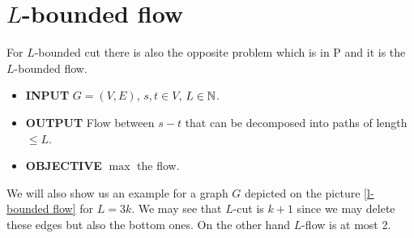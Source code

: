 \section{$L$-bounded flow}

For $L$-bounded cut there is also the opposite problem which is in P and it is the $L$-bounded flow.

\begin{itemize}[]
	\item \textbf{INPUT} $G = (V,E)$, $s,t \in V$, $L \in \mathbb{N}$.
	\item \textbf{OUTPUT} Flow between $s-t$ that can be decomposed into paths of length $\leq L$.
	\item \textbf{OBJECTIVE} $\max$ the flow.
\end{itemize}

We will also show us an example for a graph $G$ depicted on the picture \ref{l-bounded flow} for $L = 3k$. We may see that $L$-cut is $k+1$ since we may delete \textcolor{myblue}{these edges} but also \textcolor{myorange}{the bottom ones}. On the other hand $L$-flow is at most 2.

